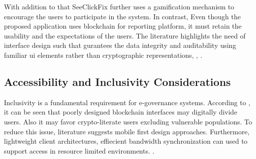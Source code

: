 With addition to that SeeClickFix further uses a gamification mechanism to encourage the users to participate in the system. In contrast, Even though the proposed application uses blockchain for reporting platform, it must retain the usability and the expectations of the users. The literature highlights the need of interface design such that gurantees the data integrity and auditability using familiar ui elements rather than cryptographic representations\cite{adeyeye2025blockchain}, \cite {marian2025transparent}, \cite{nikonenko2025blockchain}.  




\subsection{Accessibility and Inclusivity Considerations}

Inclusivity is a fundamental requirement for e-governance systems. According to \cite{bertrand2023connected}, it can be seen that poorly designed blockchain interfaces may digitally divide users. Also it may favor crypto-literate users excluding vulnerable populations. To reduce this issue, literature suggests mobile first design approaches. Furthermore, lightweight client architectures, effiecient bandwidth synchronization can used to support access in resource limited environments.  \cite{shahin2025towards}.  

